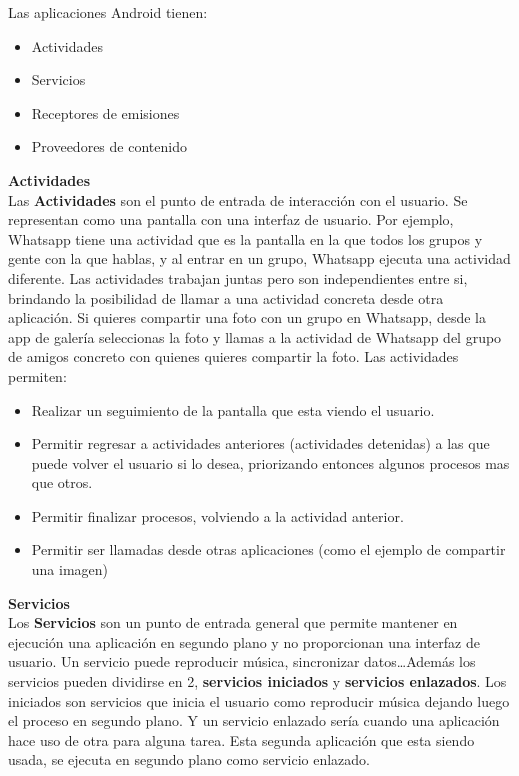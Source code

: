 Las aplicaciones Android tienen:
\begin{itemize}
    \item Actividades
    \item Servicios
    \item Receptores de emisiones
    \item Proveedores de contenido
\end{itemize}
\vspace{0.5cm}
\textbf{Actividades} \\
Las \textbf{Actividades} son el punto de entrada de interacción con el usuario. Se representan como una pantalla con una interfaz de usuario. Por ejemplo, Whatsapp tiene una actividad que es la pantalla en la que todos los grupos y gente con la que hablas, y al entrar en un grupo, Whatsapp ejecuta una actividad diferente. Las actividades trabajan juntas pero son independientes entre si, brindando la posibilidad de llamar a una actividad concreta desde otra aplicación. Si quieres compartir una foto con un grupo en Whatsapp, desde la app de galería seleccionas la foto y llamas a la actividad de Whatsapp del grupo de amigos concreto con quienes quieres compartir la foto. Las actividades permiten:

\begin{itemize}
\item Realizar un seguimiento de la pantalla que esta viendo el usuario.
\item Permitir regresar a actividades anteriores (actividades detenidas) a las que puede volver el usuario si lo desea, priorizando entonces algunos procesos mas que otros.
\item Permitir finalizar procesos, volviendo a la actividad anterior.
\item Permitir ser llamadas desde otras aplicaciones (como el ejemplo de compartir una imagen)
\end{itemize}

\vspace{0.5cm}
\textbf{Servicios} \\
Los \textbf{Servicios} son un punto de entrada general que permite mantener en ejecución una aplicación en segundo plano y no proporcionan una interfaz de usuario. Un servicio puede reproducir música, sincronizar datos\dots Además los servicios pueden dividirse en 2, \textbf{servicios iniciados} y \textbf{servicios enlazados}. Los iniciados son servicios que inicia el usuario como reproducir música dejando luego el proceso en segundo plano. Y un servicio enlazado sería cuando una aplicación hace uso de otra para alguna tarea. Esta segunda aplicación que esta siendo usada, se ejecuta en segundo plano como servicio enlazado. \\

